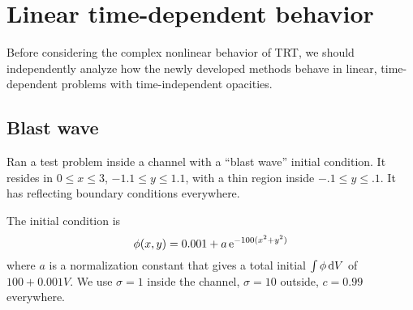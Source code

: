 \section{Linear time-dependent behavior}

Before considering the complex nonlinear behavior of TRT, we should
independently analyze how the newly developed methods behave in linear,
time-dependent problems with time-independent opacities.

\subsection{Blast wave}

Ran a test problem inside a channel with a ``blast wave'' initial condition. It
resides in $0 \le x \le 3$, $-1.1 \le y \le 1.1$, with a thin region inside
$-.1 \le y \le .1$. It has reflecting boundary conditions everywhere.

The initial condition is
\begin{equation*}
  \phi(x,y) = 0.001 + a \mathop{}\!\mathrm{e}^{-100 (x^2 + y^2) }
\end{equation*}
where $a$ is a normalization constant that gives a total initial $\int \phi
\mathop{}\!\mathrm{d} V$ of $100 + 0.001 V$. We use $\sigma=1$ inside the channel, $\sigma=10$
outside, $c=0.99$ everywhere.

